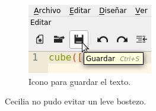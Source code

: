 \begin{figure}[ht]
  \centering \includegraphics[width=.45\textwidth]{imagenes/guardar}
  \caption{Icono para guardar el texto.}
  \label{fig:guardar}%
\end{figure}

Cecilia no pudo evitar un leve bostezo.




